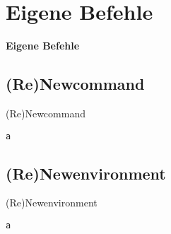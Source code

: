 \documentclass["WS\space 16-17\space -\space LaTeX-Kurs\space -\space Praesentation\space -\space 4.tex"]{subfiles}
\begin{document}
\section{Eigene Befehle}
\begin{frame}[c]
	\begin{center}
		\LARGE \textbf{Eigene Befehle}
	\end{center}
\end{frame}
\subsection{(Re)Newcommand}
\begin{frame}[c]
	\begin{center}
		\large (Re)Newcommand
	\end{center}
\end{frame}
\begin{frame}[fragile]
	\Ausgabe
	\begin{outputbox}
		
	\end{outputbox}

	\pause\Code
	\begin{lstlisting}
a
	\end{lstlisting}
\end{frame}
\subsection{(Re)Newenvironment}
\begin{frame}[c]
	\begin{center}
		\large (Re)Newenvironment
	\end{center}
\end{frame}
\begin{frame}[fragile]
	\Ausgabe
	\begin{outputbox}
		
	\end{outputbox}
	
	\pause\Code
	\begin{lstlisting}
a
	\end{lstlisting}
\end{frame}
\end{document}
